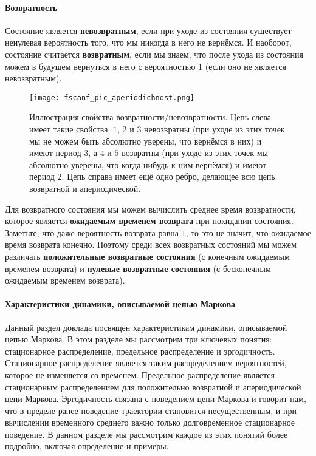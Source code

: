 \paragraph{Возвратность}
Состояние является \textbf{невозвратным}, если при уходе из состояния существует ненулевая вероятность того, что мы никогда в него не вернёмся. И наоборот, состояние считается \textbf{возвратным}, если мы знаем, что после ухода из состояния можем в будущем вернуться в него с вероятностью 1 (если оно не является невозвратным).
\begin{figure}[H]
    \centering
    \texttt{[image: fscanf\_pic\_aperiodichnost.png]}
    \caption{Иллюстрация свойства возвратности/невозвратности. Цепь слева имеет такие свойства: $1$, $2$ и $3$ невозвратны (при уходе из этих точек мы не можем быть абсолютно уверены, что вернёмся в них) и имеют период $3$, а $4$ и $5$ возвратны (при уходе из этих точек мы абсолютно уверены, что когда-нибудь к ним вернёмся) и имеют период $2$. Цепь справа имеет ещё одно ребро, делающее всю цепь возвратной и апериодической.}
\end{figure}

Для возвратного состояния мы можем вычислить среднее время возвратности, которое является \textbf{ожидаемым временем возврата} при покидании состояния. Заметьте, что даже вероятность возврата равна $1$, то это не значит, что ожидаемое время возврата конечно. Поэтому среди всех возвратных состояний мы можем различать \textbf{положительные возвратные состояния} (с конечным ожидаемым временем возврата) и \textbf{нулевые возвратные состояния} (с бесконечным ожидаемым временем возврата).

\paragraph{Характеристики динамики, описываемой цепью Маркова}

Данный раздел доклада посвящен характеристикам динамики, описываемой цепью Маркова. В этом разделе мы рассмотрим три ключевых понятия: стационарное распределение, предельное распределение и эргодичность. Стационарное распределение является таким распределением вероятностей, которое не изменяется со временем. Предельное распределение является стационарным распределением для положительно возвратной и апериодической цепи Маркова. Эргодичность связана с поведением цепи Маркова и говорит нам, что в пределе ранее поведение траектории становится несущественным, и при вычислении временного среднего важно только долговременное стационарное поведение. В данном разделе мы рассмотрим каждое из этих понятий более подробно, включая определение и примеры.

